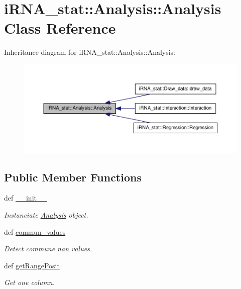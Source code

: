 \hypertarget{classiRNA__stat_1_1Analysis_1_1Analysis}{
\section{i\-R\-N\-A\-\_\-stat\-:\-:\-Analysis\-:\-:\-Analysis \-Class \-Reference}
\label{classiRNA__stat_1_1Analysis_1_1Analysis}
}


\-Inheritance diagram for i\-R\-N\-A\-\_\-stat\-:\-:\-Analysis\-:\-:\-Analysis\-:
\nopagebreak
\begin{figure}[H]
\begin{center}
\leavevmode
\includegraphics[width=350pt]{classiRNA__stat_1_1Analysis_1_1Analysis__inherit__graph}
\end{center}
\end{figure}
\subsection*{\-Public \-Member \-Functions}
\begin{DoxyCompactItemize}
\item 
\hypertarget{classiRNA__stat_1_1Analysis_1_1Analysis_a20b4c9351e7e1c1e40893d0de5d798cb}{
def \hyperlink{classiRNA__stat_1_1Analysis_1_1Analysis_a20b4c9351e7e1c1e40893d0de5d798cb}{\-\_\-\-\_\-init\-\_\-\-\_\-}}
\label{classiRNA__stat_1_1Analysis_1_1Analysis_a20b4c9351e7e1c1e40893d0de5d798cb}

\begin{DoxyCompactList}\small\item\em \-Instanciate \hyperlink{classiRNA__stat_1_1Analysis_1_1Analysis}{\-Analysis} object. \end{DoxyCompactList}\item 
\hypertarget{classiRNA__stat_1_1Analysis_1_1Analysis_a0f210007c08bf57a54e84ae15e95ea11}{
def \hyperlink{classiRNA__stat_1_1Analysis_1_1Analysis_a0f210007c08bf57a54e84ae15e95ea11}{commun\-\_\-values}}
\label{classiRNA__stat_1_1Analysis_1_1Analysis_a0f210007c08bf57a54e84ae15e95ea11}

\begin{DoxyCompactList}\small\item\em \-Detect commune nan values. \end{DoxyCompactList}\item 
def \hyperlink{classiRNA__stat_1_1Analysis_1_1Analysis_a7be1f379827b34739e9a71ba6ee2a35d}{get\-Range\-Posit}
\begin{DoxyCompactList}\small\item\em \-Get one column. \end{DoxyCompactList}\end{DoxyCompactItemize}


